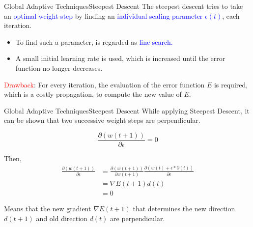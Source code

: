 \documentclass{beamer}
\begin{document}
\begin{frame}{Global Adaptive Techniques}{Steepest Descent}
The steepest descent tries to take an \textcolor{blue}{optimal weight step} by finding an \textcolor{blue}{individual scaling parameter $ \epsilon(t) $}, each iteration. 

\begin{itemize}
\item To find such a parameter, is regarded as \textcolor{blue}{line search.}
\item A small initial learning rate is used, which is increased until the error function no longer decreases. 
\end{itemize}
\pause
\vspace{5mm}
\textcolor{red}{Drawback}: For every iteration, the evaluation of the error function $ E $ is required, which is a costly propagation, to compute the new value of $ E $.  

\end{frame}

\begin{frame}{Global Adaptive Techniques}{Steepest Descent}
While applying Steepest Descent, it can be shown that two successive weight steps are perpendicular. 	
	
	
\begin{equation*}
\frac{\partial(w(t+1))}{\partial\epsilon} = 0 
\end{equation*}

Then, 
\begin{align}
\label{SD}
\frac{\partial(w(t+1))}{\partial \epsilon}  & = \frac{\partial(w(t+1))}{\partial w(t+1)} \frac{\partial (w(t) + \epsilon * \partial(t))}{\partial \epsilon} \nonumber \\ 	
& = \nabla E(t+1) d(t) \nonumber \\
& = 0
\end{align} 

Means that the new gradient $ \nabla E(t+1) $ that determines the new direction $ d(t+1) $ and old direction $ d(t) $ are perpendicular.  

\end{frame}
\end{document}
